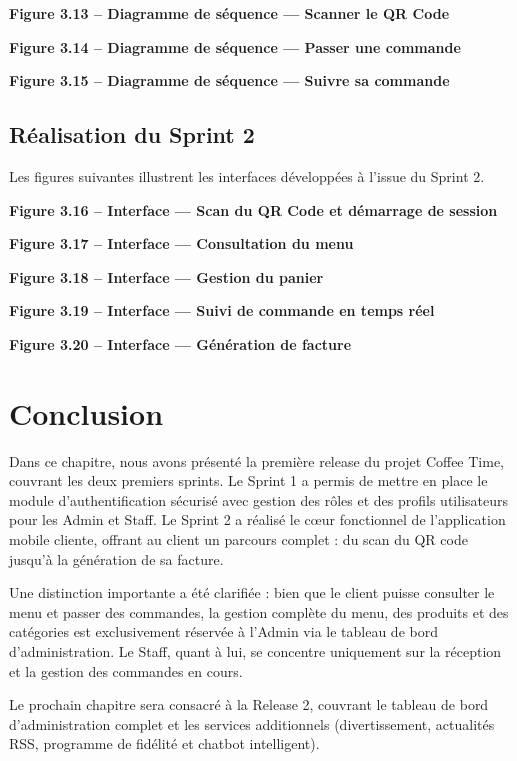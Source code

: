 \textbf{Figure 3.13 – Diagramme de séquence — Scanner le QR Code}

\textbf{Figure 3.14 – Diagramme de séquence — Passer une commande}

\textbf{Figure 3.15 – Diagramme de séquence — Suivre sa commande}

\subsection{Réalisation du Sprint 2}

Les figures suivantes illustrent les interfaces développées à l'issue du Sprint 2.

\textbf{Figure 3.16 – Interface — Scan du QR Code et démarrage de session}

\textbf{Figure 3.17 – Interface — Consultation du menu}

\textbf{Figure 3.18 – Interface — Gestion du panier}

\textbf{Figure 3.19 – Interface — Suivi de commande en temps réel}

\textbf{Figure 3.20 – Interface — Génération de facture}

\section*{Conclusion}

Dans ce chapitre, nous avons présenté la première release du projet Coffee Time, couvrant les deux premiers sprints. Le Sprint 1 a permis de mettre en place le module d'authentification sécurisé avec gestion des rôles et des profils utilisateurs pour les Admin et Staff. Le Sprint 2 a réalisé le cœur fonctionnel de l'application mobile cliente, offrant au client un parcours complet : du scan du QR code jusqu'à la génération de sa facture.

Une distinction importante a été clarifiée : bien que le client puisse consulter le menu et passer des commandes, la gestion complète du menu, des produits et des catégories est exclusivement réservée à l'Admin via le tableau de bord d'administration. Le Staff, quant à lui, se concentre uniquement sur la réception et la gestion des commandes en cours.

Le prochain chapitre sera consacré à la Release 2, couvrant le tableau de bord d'administration complet et les services additionnels (divertissement, actualités RSS, programme de fidélité et chatbot intelligent).
